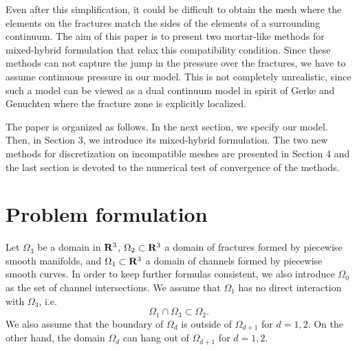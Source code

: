 \documentclass[times]{nlaauth}%
\def\Real{{\rm\bf R}}
\begin{document}
Even after this simplification, it could be difficult to obtain the mesh where the elements on the fractures match the sides of 
the elements of a surrounding continuum. The aim of this paper is to present two mortar-like methods for mixed-hybrid formulation
that relax this compatibility condition. Since these methods can not capture the jump in the pressure over the fractures, we have
to assume continuous pressure in our model. This is not completely unrealistic, since such a model can be viewed 
as a dual continuum model
in spirit of Gerke and Genuchten \cite{GerkeGenuchten1993a} where the fracture zone is explicitly localized. 

The paper is organized as follows. In the next section, we specify our model. Then, in Section 3,  we introduce its mixed-hybrid formulation.
The two new methods for discretization on incompatible meshes are presented in Section 4 and the last section is devoted to 
the numerical test of convergence of the methods.


\section{Problem formulation}
Let $\Omega_3$ be a domain in $\Real^3$, $\Omega_2\subset \Real^3$
a domain of fractures formed by piecewise smooth manifolds, and $\Omega_1 \subset \Real^3$ 
a domain of channels formed by piecewise smooth curves.
In order to keep further formulas consistent, we also introduce  $\Omega_0$ as the set of 
channel intersections. We assume that $\Omega_1$ has no direct interaction with $\Omega_3$, i.e.
\begin{equation}
  \Omega_{1}\cap\Omega_3 \subset \Omega_2.
\end{equation}
We also assume that the boundary of $\Omega_{d}$ is outside of $\Omega_{d+1}$ for $d=1,2$.
On the other hand, the domain $\Omega_d$ can hang out of $\Omega_{d+1}$ for $d=1,2$.
\end{document}
